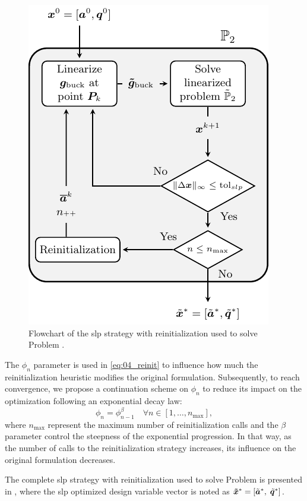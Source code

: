 \begin{figure}
    \centering
    \includegraphics[width=0.7\linewidth]{figures/04_TTO_improvements/06_SLP_algo/SLP_algo.pdf}
    \caption{Flowchart of the \gls{slp} strategy with reinitialization used to solve Problem .}
    \label{fig:04_slp_solution}
\end{figure}

The $\phi_n$ parameter is used in \eqref{eq:04_reinit} to influence how much the reinitialization heuristic modifies the original formulation. Subsequently, to reach convergence, we propose a continuation scheme on $\phi_n$ to reduce its impact on the optimization following an exponential decay law:
\begin{equation}
    \phi_n = \phi_{n-1}^\beta \quad \forall n \in [1,\dots,n_{\text{max}}],
    \label{eq:04_phi}
\end{equation}
where $n_{\text{max}}$ represent the maximum number of reinitialization calls and the $\beta$ parameter control the steepness of the exponential progression. In that way, as the number of calls to the reinitialization strategy increases, its influence on the original formulation decreases.

The complete \gls{slp} strategy with reinitialization used to solve Problem  is presented in , where the \gls{slp} optimized design variable vector is noted as $\bm{\tilde{x}}^*=[\tilde{\bm{a}}^*, \; \tilde{\bm{q}}^*]$.

